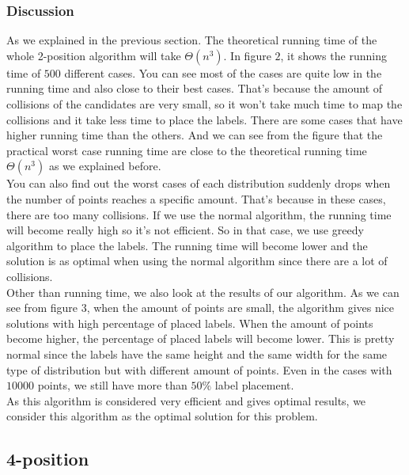 \documentclass[crop=false,a4paper,oneside,11pt]{standalone}
\begin{document}
\subsubsection{Discussion}
As we explained in the previous section. The theoretical running time of the whole 2-position algorithm will take $\Theta(n^3)$. In figure $2$, it shows the running time of $500$ different cases. You can see most of the cases are quite low in the running time and also close to their best cases. That's because the amount of collisions of the candidates are very small, so it won't take much time to map the collisions and it take less time to place the labels. There are some cases that have higher running time than the others. And we can see from the figure that the practical worst case running time are close to the theoretical running time $\Theta(n^3)$ as we explained before. \\
You can also find out the worst cases of each distribution suddenly drops when the number of points reaches a specific amount. That's because in these cases, there are too many collisions. If we use the normal algorithm, the running time will become really high so it's not efficient. So in that case, we use greedy algorithm to place the labels. The running time will become lower and the solution is as optimal when using the normal algorithm since there are a lot of collisions.\\
Other than running time, we also look at the results of our algorithm. As we can see from figure $3$, when the amount of points are small, the algorithm gives nice solutions with high percentage of placed labels. When the amount of points become higher, the percentage of placed labels will become lower. This is pretty normal since the labels have the same height and the same width for the same type of distribution but with different amount of points. Even in the cases with $10000$ points, we still have more than $50\%$ label placement. \\
As this algorithm is considered very efficient and gives optimal results, we consider this algorithm as the optimal solution for this problem.

\subsection{4-position}
\end{document}
